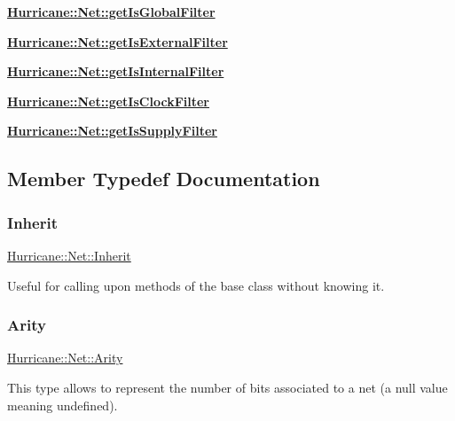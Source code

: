 \begin{DoxyItemize}
\item {\bfseries \hyperlink{classHurricane_1_1Net_a1730ed1247cd9bce7fcf519ea60dc738}{Hurricane\+::\+Net\+::get\+Is\+Global\+Filter}}
\item {\bfseries \hyperlink{classHurricane_1_1Net_a3af91a80e219e37e70229e61dfd385da}{Hurricane\+::\+Net\+::get\+Is\+External\+Filter}}
\item {\bfseries \hyperlink{classHurricane_1_1Net_a7a2d1c4ab84bf81a16e24557d2342ea5}{Hurricane\+::\+Net\+::get\+Is\+Internal\+Filter}}
\item {\bfseries \hyperlink{classHurricane_1_1Net_afdb2269f3a88923c25264f6f785372a1}{Hurricane\+::\+Net\+::get\+Is\+Clock\+Filter}}
\item {\bfseries \hyperlink{classHurricane_1_1Net_ac241f44abf1f332004dd6103ee1dfa48}{Hurricane\+::\+Net\+::get\+Is\+Supply\+Filter}} 
\end{DoxyItemize}

\subsection{Member Typedef Documentation}
\mbox{\label{classHurricane_1_1Net_a3f1ac0fcb03638b2ffa9af6a9a58de15}} 
\subsubsection{\texorpdfstring{Inherit}{Inherit}}
{\footnotesize\ttfamily \hyperlink{classHurricane_1_1Net_a3f1ac0fcb03638b2ffa9af6a9a58de15}{Hurricane\+::\+Net\+::\+Inherit}}

Useful for calling upon methods of the base class without knowing it. \mbox{\label{classHurricane_1_1Net_a3a242d929e0c733f90f3f69be8cc427b}} 
\subsubsection{\texorpdfstring{Arity}{Arity}}
{\footnotesize\ttfamily \hyperlink{classHurricane_1_1Net_a3a242d929e0c733f90f3f69be8cc427b}{Hurricane\+::\+Net\+::\+Arity}}

This type allows to represent the number of bits associated to a net (a null value meaning undefined). 

